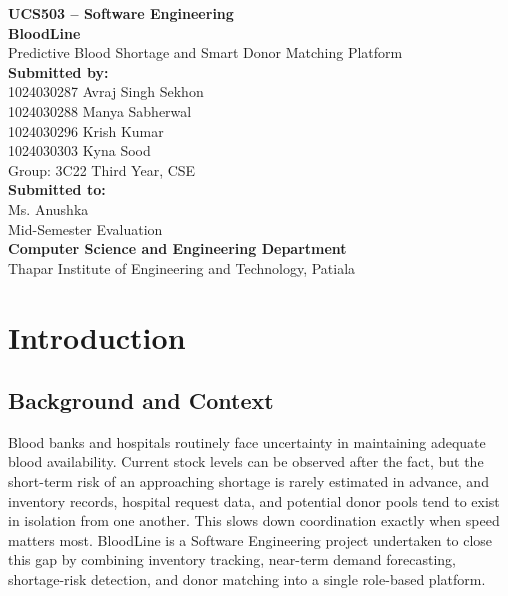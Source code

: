 \documentclass[12pt,a4paper,twoside]{report}
\begin{document}
\thispagestyle{empty}
\begin{center}
\vspace*{1.1in}
{\large\bfseries UCS503 -- Software Engineering}\\[0.9in]
{\Huge\bfseries BloodLine}\\[8pt]
{\large Predictive Blood Shortage and Smart Donor Matching Platform}\\[0.9in]
{\large\bfseries Submitted by:}\\[10pt]
{\small 1024030287 Avraj Singh Sekhon\\1024030288 Manya Sabherwal\\1024030296 Krish Kumar\\1024030303 Kyna Sood}\\[10pt]
{\small Group: 3C22 Third Year, CSE}\\[0.55in]
{\large\bfseries Submitted to:}\\[10pt]
{\small Ms. Anushka}\\[0.8in]
{\small Mid-Semester Evaluation\\
\textbf{Computer Science and Engineering Department}\\
Thapar Institute of Engineering and Technology, Patiala}
\end{center}
\clearpage

\tableofcontents
\thispagestyle{empty}
\clearpage
{}

\chapter{Introduction}
\section{Background and Context}
Blood banks and hospitals routinely face uncertainty in maintaining adequate blood availability. Current stock levels can be observed after the fact, but the short-term risk of an approaching shortage is rarely estimated in advance, and inventory records, hospital request data, and potential donor pools tend to exist in isolation from one another. This slows down coordination exactly when speed matters most. BloodLine is a Software Engineering project undertaken to close this gap by combining inventory tracking, near-term demand forecasting, shortage-risk detection, and donor matching into a single role-based platform.
\end{document}
